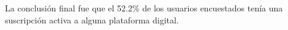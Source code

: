 La conclusi\'on final fue que el 52.2\% de los usuarios encuestados ten\'ia una suscripci\'on activa a alguna plataforma digital.



